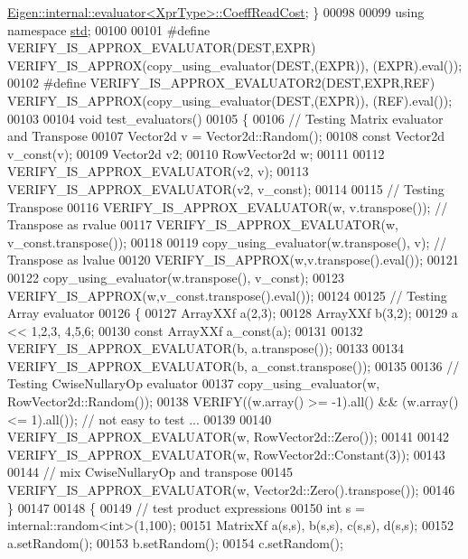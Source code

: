 \begin{DoxyCode}
      \hyperlink{struct_eigen_1_1internal_1_1evaluator}{Eigen::internal::evaluator<XprType>::CoeffReadCost}; \}
00098 
00099 \textcolor{keyword}{using namespace }\hyperlink{namespacestd}{std};
00100 
00101 \textcolor{preprocessor}{#define VERIFY\_IS\_APPROX\_EVALUATOR(DEST,EXPR) VERIFY\_IS\_APPROX(copy\_using\_evaluator(DEST,(EXPR)),
       (EXPR).eval());}
00102 \textcolor{preprocessor}{#define VERIFY\_IS\_APPROX\_EVALUATOR2(DEST,EXPR,REF) VERIFY\_IS\_APPROX(copy\_using\_evaluator(DEST,(EXPR)),
       (REF).eval());}
00103 
00104 \textcolor{keywordtype}{void} test\_evaluators()
00105 \{
00106   \textcolor{comment}{// Testing Matrix evaluator and Transpose}
00107   Vector2d v = Vector2d::Random();
00108   \textcolor{keyword}{const} Vector2d v\_const(v);
00109   Vector2d v2;
00110   RowVector2d w;
00111 
00112   VERIFY\_IS\_APPROX\_EVALUATOR(v2, v);
00113   VERIFY\_IS\_APPROX\_EVALUATOR(v2, v\_const);
00114 
00115   \textcolor{comment}{// Testing Transpose}
00116   VERIFY\_IS\_APPROX\_EVALUATOR(w, v.transpose()); \textcolor{comment}{// Transpose as rvalue}
00117   VERIFY\_IS\_APPROX\_EVALUATOR(w, v\_const.transpose());
00118 
00119   copy\_using\_evaluator(w.transpose(), v); \textcolor{comment}{// Transpose as lvalue}
00120   VERIFY\_IS\_APPROX(w,v.transpose().eval());
00121 
00122   copy\_using\_evaluator(w.transpose(), v\_const);
00123   VERIFY\_IS\_APPROX(w,v\_const.transpose().eval());
00124 
00125   \textcolor{comment}{// Testing Array evaluator}
00126   \{
00127     ArrayXXf a(2,3);
00128     ArrayXXf b(3,2);
00129     a << 1,2,3, 4,5,6;
00130     \textcolor{keyword}{const} ArrayXXf a\_const(a);
00131 
00132     VERIFY\_IS\_APPROX\_EVALUATOR(b, a.transpose());
00133 
00134     VERIFY\_IS\_APPROX\_EVALUATOR(b, a\_const.transpose());
00135 
00136     \textcolor{comment}{// Testing CwiseNullaryOp evaluator}
00137     copy\_using\_evaluator(w, RowVector2d::Random());
00138     VERIFY((w.array() >= -1).all() && (w.array() <= 1).all()); \textcolor{comment}{// not easy to test ...}
00139 
00140     VERIFY\_IS\_APPROX\_EVALUATOR(w, RowVector2d::Zero());
00141 
00142     VERIFY\_IS\_APPROX\_EVALUATOR(w, RowVector2d::Constant(3));
00143     
00144     \textcolor{comment}{// mix CwiseNullaryOp and transpose}
00145     VERIFY\_IS\_APPROX\_EVALUATOR(w, Vector2d::Zero().transpose());
00146   \}
00147 
00148   \{
00149     \textcolor{comment}{// test product expressions}
00150     \textcolor{keywordtype}{int} s = internal::random<int>(1,100);
00151     MatrixXf a(s,s), b(s,s), c(s,s), d(s,s);
00152     a.setRandom();
00153     b.setRandom();
00154     c.setRandom();

\end{DoxyCode}
